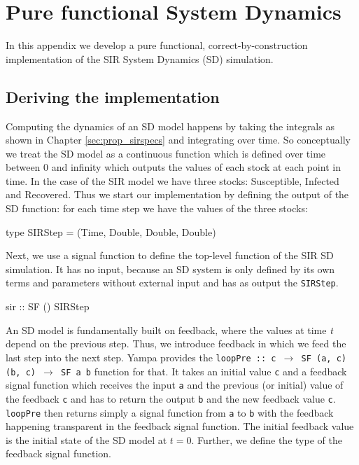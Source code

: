 \chapter{Pure functional System Dynamics}
\label{app:sd_simulation}
In this appendix we develop a pure functional, correct-by-construction implementation of the SIR System Dynamics (SD) simulation. %

\section{Deriving the implementation}
Computing the dynamics of an SD model happens by taking the integrals as shown in Chapter \ref{sec:prop_sirspecs} and integrating over time. So conceptually we treat the SD model as a continuous function which is defined over time between 0 and infinity which outputs the values of each stock at each point in time. In the case of the SIR model we have three stocks: Susceptible, Infected and Recovered. Thus we start our implementation by defining the output of the SD function: for each time step we have the values of the three stocks:

\begin{HaskellCode}
type SIRStep = (Time, Double, Double, Double)
\end{HaskellCode}

Next, we use a signal function to define the top-level function of the SIR SD simulation. It has no input, because an SD system is only defined by its own terms and parameters without external input and has as output the \texttt{SIRStep}.

\begin{HaskellCode}
sir :: SF () SIRStep
\end{HaskellCode}

An SD model is fundamentally built on feedback, where the values at time \textit{t} depend on the previous step. Thus, we introduce feedback in which we feed the last step into the next step. Yampa provides the \texttt{loopPre :: c $\to$ SF (a, c) (b, c) $\to$ SF a b} function for that. It takes an initial value \texttt{c} and a feedback signal function which receives the input \texttt{a} and the previous (or initial) value of the feedback \texttt{c} and has to return the output \texttt{b} and the new feedback value \texttt{c}. \texttt{loopPre} then returns simply a signal function from \texttt{a} to \texttt{b} with the feedback happening transparent in the feedback signal function. The initial feedback value is the initial state of the SD model at $t = 0$. Further, we define the type of the feedback signal function.

